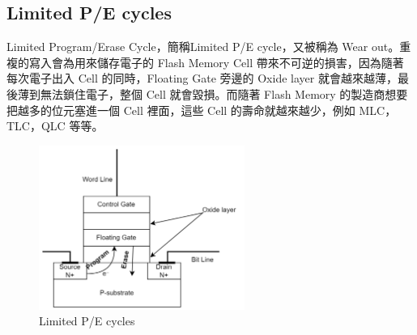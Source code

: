 \subsection{Limited P/E cycles}\label{s2.1.4}
\indent
Limited Program/Erase Cycle，簡稱Limited P/E cycle，又被稱為 Wear out。重複的寫入會為用來儲存電子的 Flash Memory Cell 帶來不可逆的損害，因為隨著每次電子出入 Cell 的同時，Floating Gate 旁邊的 Oxide layer 就會越來越薄，最後薄到無法鎖住電子，整個 Cell 就會毀損\cite{8631191}。而隨著 Flash Memory 的製造商想要把越多的位元塞進一個 Cell 裡面，這些 Cell 的壽命就越來越少，例如 MLC，TLC，QLC 等等。
\begin{figure}[H]
    \centering
    \includegraphics[width=0.6\textwidth]{picture/ch2/Limited_P-E_Cycles.png}
    \caption{Limited P/E cycles}
    \label{f2.3}
\end{figure}

